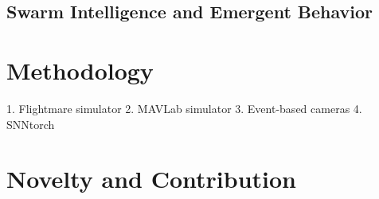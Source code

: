 \documentclass{article}
\begin{document}
\subsection{Swarm Intelligence and Emergent Behavior}

\section{Methodology}

1. Flightmare simulator
2. MAVLab simulator
3. Event-based cameras
4. SNNtorch


\section{Novelty and Contribution}

\printbibliography[title={\section{References}}]
\end{document}
